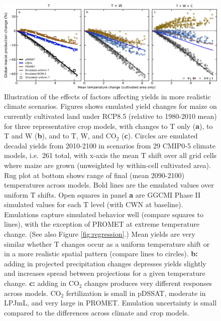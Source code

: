 \documentclass[gmd, manuscript]{copernicus} %
\begin{document}
\begin{figure}[ht]
    \centering
    \includegraphics[width = 16.5cm]{figures/global_em_maize.png}
    \caption{
    Illustration of the effects of factors affecting yields in more realistic climate scenarios. 
    Figures shows emulated yield changes for maize on currently cultivated land under RCP8.5 (relative to 1980-2010 mean) for three representative crop models, with changes to T only (\textbf{a}), to T and W (\textbf{b}), and to T, W, and CO$_2$ (\textbf{c}).
    Circles are emulated decadal yields from 2010-2100 in scenarios from 29 CMIP0-5 climate models, i.e.\ 261 total, with x-axis the mean T shift over all grid cells where maize are grown (unweighted by within-cell cultivated area). Rug plot at bottom shows range of final (mean 2090-2100) temperatures across models.
    Bold lines are the emulated values over uniform T shifts. 
    Open squares in panel \textbf{a} are GGCMI Phase II simulated values for each T level (with CWN at baseline).  Emulations capture simulated behavior well (compare squares to lines), with the exception of PROMET at extreme temperature change. (See also Figure \ref{fig:regression}.)
    Mean yields are very similar whether T changes occur as a uniform temperature shift or in a more realistic spatial pattern (compare lines to circles). 
    \textbf{b:} adding in projected precipitation changes depresses yields slightly and increases spread between projections for a given temperature change. 
    \textbf{c:} adding in CO$_2$ changes produces very different responses across models. CO$_2$ fertilization is small in pDSSAT, moderate in LPJmL, and very large in PROMET. 
    Emulation uncertainty is small compared to the differences across climate and crop models.
    }
    \label{fig:globe_em}
\end{figure}
\end{document}
